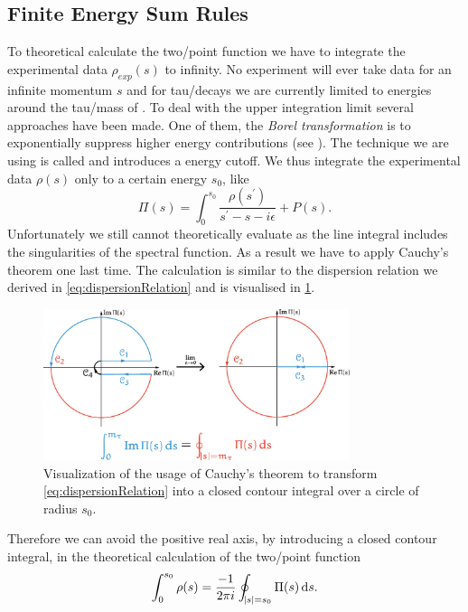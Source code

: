 \documentclass[../../index.tex]{subfiles}
\begin{document}
\subsection{Finite Energy Sum Rules}
To theoretical calculate the two\-/point function we have to integrate the
experimental data \(\rho_{exp}(s)\) to infinity. No experiment will ever take
data for an infinite momentum \(s\) and for tau\-/decays we are currently
limited to energies around the tau\-/mass of
. To deal with the upper integration limit
several approaches have been made. One of them, the \textit{Borel
  transformation} is to exponentially suppress higher energy contributions (see
\cite{Weinberg1996,Rafael1997}). The technique we are using is called
 and introduces a energy cutoff. We thus
integrate the experimental data \(\rho(s)\) only to a certain energy \(s_0\),
like
\begin{equation}
  \Pi(s) = \int_0^{s_0} \frac{\rho(s^\prime)}{s^\prime-s-i\epsilon} + P(s).
\end{equation}
Unfortunately we still cannot theoretically evaluate  as the line integral includes the singularities of the spectral
function. As a result we have to apply Cauchy's theorem one last time. The
calculation is similar to the dispersion relation we derived in
\cref{eq:dispersionRelation} and is visualised in
\cref{fig:theoreticalTwoPointFunction}.
\begin{figure}
  \centering
  \includegraphics[width=0.8\textwidth]{./images/rTauCauchysTheorem.eps}
  \caption{Visualization of the usage of Cauchy's theorem to transform
    \cref{eq:dispersionRelation} into a closed contour integral over a circle of
    radius $s_0$.}
  \label{fig:theoreticalTwoPointFunction}
\end{figure}
Therefore we can avoid the positive real axis, by introducing a closed contour
integral, in the theoretical calculation of the two\-/point function
\begin{equation}
  \int_0^{s_0} \rho(s) = \frac{-1}{2\pi i}\oint_{\abs{s}=s_0} \Pi(s) \dif s.
\end{equation}
\end{document}
